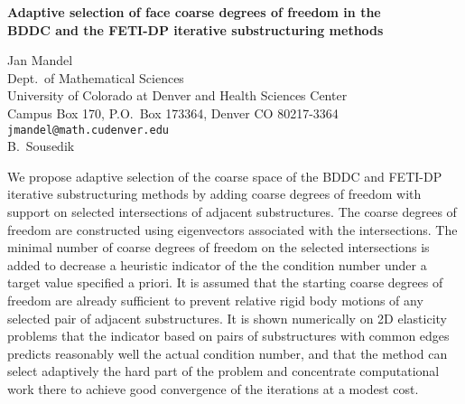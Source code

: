 \documentclass{report}
\begin{document}

\begin{center}
{\large
{\bf Adaptive selection of face coarse degrees of freedom in the \\
	BDDC and the FETI-DP iterative substructuring methods}}

	Jan Mandel \\
	Dept.~of Mathematical Sciences \\
	University of Colorado at Denver and Health Sciences Center \\
	Campus Box 170, P.O.~Box 173364, Denver CO 80217-3364 \\
	{\tt jmandel@math.cudenver.edu} \\
	B.~Sousedik
\end{center}
We propose adaptive selection of the coarse space of the
BDDC and FETI-DP iterative substructuring methods by adding
coarse degrees of freedom with support on selected
intersections of adjacent substructures. The coarse degrees
of freedom are constructed using eigenvectors associated
with the intersections. The minimal number of coarse degrees
of freedom on the selected intersections is added to
decrease a heuristic indicator of the the condition number
under a target value specified a priori. It is assumed that
the starting coarse degrees of freedom are already
sufficient to prevent relative rigid body motions of any
selected pair of adjacent substructures. It is shown
numerically on 2D elasticity problems that the indicator
based on pairs of substructures with common edges predicts
reasonably well the actual condition number, and that the
method can select adaptively the hard part of the problem
and concentrate computational work there to achieve good
convergence of the iterations at a modest cost.



\end{document}
